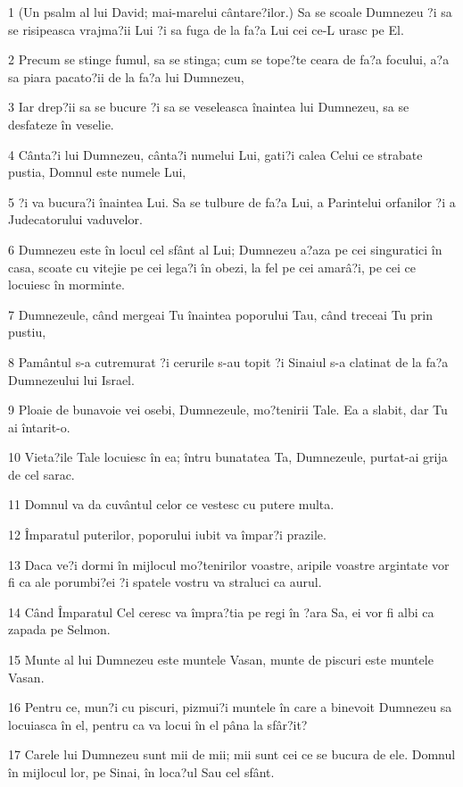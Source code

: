 \par 1 (Un psalm al lui David; mai-marelui cântare?ilor.) Sa se scoale Dumnezeu ?i sa se risipeasca vrajma?ii Lui ?i sa fuga de la fa?a Lui cei ce-L urasc pe El.
\par 2 Precum se stinge fumul, sa se stinga; cum se tope?te ceara de fa?a focului, a?a sa piara pacato?ii de la fa?a lui Dumnezeu,
\par 3 Iar drep?ii sa se bucure ?i sa se veseleasca înaintea lui Dumnezeu, sa se desfateze în veselie.
\par 4 Cânta?i lui Dumnezeu, cânta?i numelui Lui, gati?i calea Celui ce strabate pustia, Domnul este numele Lui,
\par 5 ?i va bucura?i înaintea Lui. Sa se tulbure de fa?a Lui, a Parintelui orfanilor ?i a Judecatorului vaduvelor.
\par 6 Dumnezeu este în locul cel sfânt al Lui; Dumnezeu a?aza pe cei singuratici în casa, scoate cu vitejie pe cei lega?i în obezi, la fel pe cei amarâ?i, pe cei ce locuiesc în morminte.
\par 7 Dumnezeule, când mergeai Tu înaintea poporului Tau, când treceai Tu prin pustiu,
\par 8 Pamântul s-a cutremurat ?i cerurile s-au topit ?i Sinaiul s-a clatinat de la fa?a Dumnezeului lui Israel.
\par 9 Ploaie de bunavoie vei osebi, Dumnezeule, mo?tenirii Tale. Ea a slabit, dar Tu ai întarit-o.
\par 10 Vieta?ile Tale locuiesc în ea; întru bunatatea Ta, Dumnezeule, purtat-ai grija de cel sarac.
\par 11 Domnul va da cuvântul celor ce vestesc cu putere multa.
\par 12 Împaratul puterilor, poporului iubit va împar?i prazile.
\par 13 Daca ve?i dormi în mijlocul mo?tenirilor voastre, aripile voastre argintate vor fi ca ale porumbi?ei ?i spatele vostru va straluci ca aurul.
\par 14 Când Împaratul Cel ceresc va împra?tia pe regi în ?ara Sa, ei vor fi albi ca zapada pe Selmon.
\par 15 Munte al lui Dumnezeu este muntele Vasan, munte de piscuri este muntele Vasan.
\par 16 Pentru ce, mun?i cu piscuri, pizmui?i muntele în care a binevoit Dumnezeu sa locuiasca în el, pentru ca va locui în el pâna la sfâr?it?
\par 17 Carele lui Dumnezeu sunt mii de mii; mii sunt cei ce se bucura de ele. Domnul în mijlocul lor, pe Sinai, în loca?ul Sau cel sfânt.
